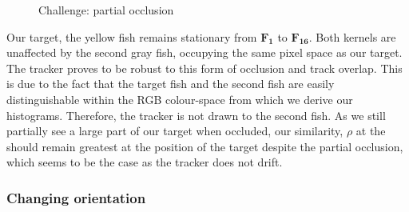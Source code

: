 \begin{figure}
{\begin{tabular}{cccc}
        \end{tabular}}
    \caption{Challenge: partial occlusion\label{fig:mean_shift_partial_occlusion}
 }
\end{figure}

Our target, the yellow fish remains stationary from
$\mathbf{F_{1}}$ to $\mathbf{F_{16}}$. Both kernels are unaffected by the second
gray fish, occupying the same pixel space as our target. The tracker proves to be
robust to this form of occlusion and track overlap.
This is due to the fact that the target fish and the second fish are easily
distinguishable within the RGB colour-space from which we derive our histograms.
Therefore, the tracker is not drawn to the second fish.
As we still partially see a large part of our target when occluded, our
similarity, $\rho$ at the should remain greatest at the position of the target
despite the partial occlusion, which seems to be the case as the tracker does
not drift.

\subsubsection{Changing orientation}



